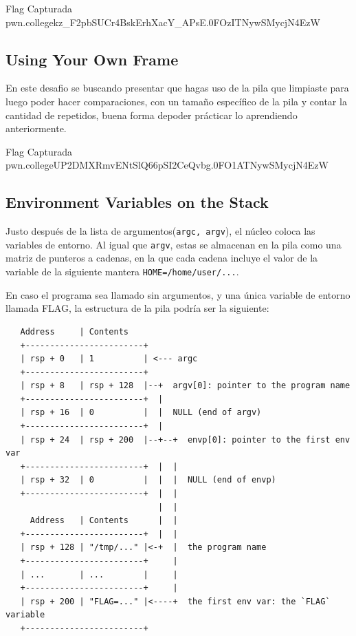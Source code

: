 \begin{flagbox}{Flag Capturada}
	pwn.college{kz_F2pbSUCr4BskErhXacY_APsE.0FOzITNywSMycjN4EzW}
\end{flagbox}

\subsection{Using Your Own Frame}\label{subsec:10-05using_your_own_frame}

En este desafio se buscando presentar que hagas uso de la pila que limpiaste para
luego poder hacer comparaciones, con un tamaño específico de la pila
y contar la cantidad de repetidos, buena forma depoder prácticar lo aprendiendo anteriormente.

\begin{flagbox}{Flag Capturada}
	pwn.college{UP2DMXRmvENtSlQ66pSI2CeQvbg.0FO1ATNywSMycjN4EzW}
\end{flagbox}

\subsection{Environment Variables on the Stack}\label{subsec:10-06environment_variables_on_the_stack}

Justo después de la lista de argumentos(\texttt{argc, argv}), el núcleo coloca
las variables de entorno. Al igual que \texttt{argv}, estas se almacenan en la pila
como una matriz de punteros a cadenas, en la que cada cadena incluye el valor de
la variable de la siguiente mantera \texttt{HOME=/home/user/...}.

En caso el programa sea llamado sin argumentos, y una única variable de entorno llamada FLAG,
la estructura de la pila podría ser la siguiente:

\begin{verbatim}
   Address     | Contents
   +------------------------+
   | rsp + 0   | 1          | <--- argc
   +------------------------+
   | rsp + 8   | rsp + 128  |--+  argv[0]: pointer to the program name
   +------------------------+  |
   | rsp + 16  | 0          |  |  NULL (end of argv)
   +------------------------+  |
   | rsp + 24  | rsp + 200  |--+--+  envp[0]: pointer to the first env var
   +------------------------+  |  |
   | rsp + 32  | 0          |  |  |  NULL (end of envp)
   +------------------------+  |  |
                               |  |
     Address   | Contents      |  |
   +------------------------+  |  |
   | rsp + 128 | "/tmp/..." |<-+  |  the program name
   +------------------------+     |
   | ...       | ...        |     |
   +------------------------+     |
   | rsp + 200 | "FLAG=..." |<----+  the first env var: the `FLAG` variable
   +------------------------+
\end{verbatim}

